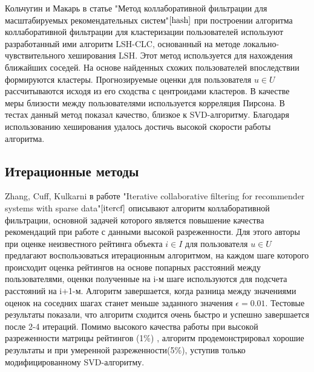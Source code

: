 \documentclass[12pt]{article} %
\begin{document}
\par 
Кольчугин и Макарь в статье "Метод коллаборативной фильтрации для масштабируемых рекомендательных систем"$\cite{hash}$ при построении алгоритма коллаборативной фильтрации для кластеризации пользователей используют разработанный ими алгоритм LSH-CLC, основанный на методе локально-чувствительного хеширования LSH. Этот метод используется для нахождения ближайших соседей. На основе найденных схожих пользователей впоследствии формируются кластеры. Прогнозируемые оценки для пользователя $u \in U$ рассчитываются исходя из его сходства с центроидами кластеров. В качестве меры близости между пользователями используется корреляция Пирсона.  В тестах данный метод показал качество, близкое к SVD-алгоритму. Благодаря использованию хеширования удалось достичь высокой скорости работы алгоритма.   

\subsection{Итерационные методы}
\par
Zhang, Cuff, Kulkarni в работе "Iterative collaborative filtering for recommender systems with sparse data"$\cite{itercf}$ описывают алгоритм коллаборативной фильтрации, основной задачей которого является повышение качества рекомендаций при работе с данными высокой разреженности. Для этого авторы при оценке неизвестного рейтинга объекта $i \in I$ для пользователя $u \in U$ предлагают воспользоваться итерационным алгоритмом, на каждом шаге которого происходит оценка рейтингов на основе попарных расстояний между пользователями, оценки полученные на i-м шаге используются для подсчета расстояний на i+1-м. Алгоритм завершается, когда разница между значениями оценок на соседних шагах станет меньше заданного значения $\epsilon=0.01$. Тестовые результаты показали, что алгоритм сходится очень быстро и успешно завершается после 2-4 итераций. Помимо высокого качества работы при высокой разреженности матрицы рейтингов (1\%) , алгоритм продемонстрировал хорошие результаты и при умеренной разреженности(5\%), уступив только модифицированному SVD-алгоритму.
\end{document}
